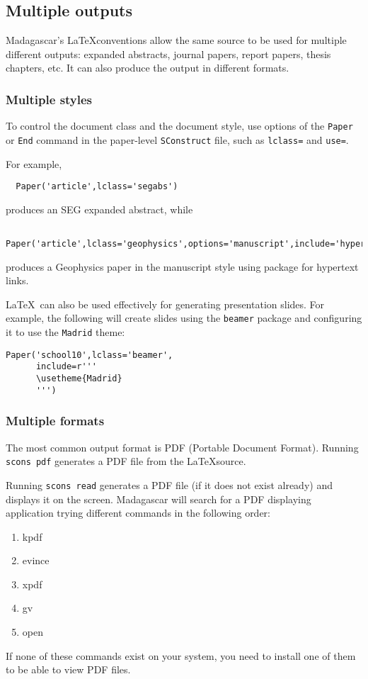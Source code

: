 {{\subsection{Multiple outputs}

Madagascar's \LaTeX conventions allow the same source to be used for
multiple different outputs: expanded abstracts, journal papers, report
papers, thesis chapters, etc. It can also produce the output in
different formats.

\subsubsection{Multiple styles}

To control the document class and the document style, use options of the \texttt{Paper} or \texttt{End} command in the paper-level \texttt{SConstruct} file, such as  \texttt{lclass=} and \texttt{use=}.

For example,
\lstset{language=python,showstringspaces=false,frame=single}
\begin{lstlisting}
  Paper('article',lclass='segabs')
\end{lstlisting}
produces an SEG expanded abstract, while
\lstset{language=python,showstringspaces=false,frame=single}
\begin{lstlisting}
  Paper('article',lclass='geophysics',options='manuscript',include='hyperref')
\end{lstlisting}
produces a Geophysics paper in the manuscript style using  package for hypertext links.

\LaTeX\ can also be used effectively for generating presentation slides. For example, the following will create slides using the \texttt{beamer} package and configuring it to use the \texttt{Madrid} theme:
\lstset{language=python,showstringspaces=false,frame=single}
\begin{lstlisting}
Paper('school10',lclass='beamer',
      include=r'''
      \usetheme{Madrid}
      ''')
\end{lstlisting}    

\subsubsection{Multiple formats}

The most common output format is PDF (Portable Document
Format). Running \texttt{scons pdf} generates a PDF file from the
\LaTeX source.

Running \texttt{scons read} generates a PDF file (if it does not exist
already) and displays it on the screen. Madagascar will search for a
PDF displaying application trying different commands in the following
order:
\begin{enumerate}
\item kpdf
\item evince
\item xpdf
\item gv
\item open 
\end{enumerate}
If none of these commands exist on your system, you need to install
one of them to be able to view PDF files.

}}
